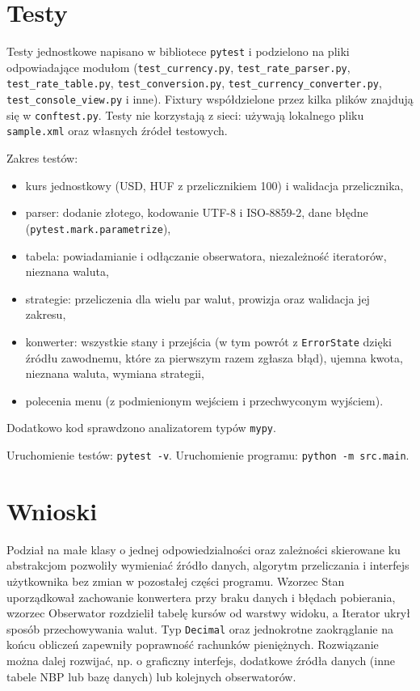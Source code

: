 \documentclass[12pt,a4paper]{article}
\begin{document}
\section{Testy}

Testy jednostkowe napisano w bibliotece \texttt{pytest} i podzielono na pliki odpowiadające modułom (\texttt{test\_currency.py}, \texttt{test\_rate\_parser.py}, \texttt{test\_rate\_table.py}, \texttt{test\_conversion.py}, \texttt{test\_currency\_converter.py}, \texttt{test\_console\_view.py} i inne). Fixtury współdzielone przez kilka plików znajdują się w \texttt{conftest.py}. Testy nie korzystają z sieci: używają lokalnego pliku \texttt{sample.xml} oraz własnych źródeł testowych.

Zakres testów:
\begin{itemize}
    \item kurs jednostkowy (USD, HUF z przelicznikiem 100) i walidacja przelicznika,
    \item parser: dodanie złotego, kodowanie UTF-8 i ISO-8859-2, dane błędne (\texttt{pytest.mark.parametrize}),
    \item tabela: powiadamianie i odłączanie obserwatora, niezależność iteratorów, nieznana waluta,
    \item strategie: przeliczenia dla wielu par walut, prowizja oraz walidacja jej zakresu,
    \item konwerter: wszystkie stany i przejścia (w tym powrót z \texttt{ErrorState} dzięki źródłu zawodnemu, które za pierwszym razem zgłasza błąd), ujemna kwota, nieznana waluta, wymiana strategii,
    \item polecenia menu (z podmienionym wejściem i przechwyconym wyjściem).
\end{itemize}
Dodatkowo kod sprawdzono analizatorem typów \texttt{mypy}.

Uruchomienie testów: \texttt{pytest -v}. Uruchomienie programu: \texttt{python -m src.main}.

\section{Wnioski}

Podział na małe klasy o jednej odpowiedzialności oraz zależności skierowane ku abstrakcjom pozwoliły wymieniać źródło danych, algorytm przeliczania i interfejs użytkownika bez zmian w pozostałej części programu. Wzorzec Stan uporządkował zachowanie konwertera przy braku danych i błędach pobierania, wzorzec Obserwator rozdzielił tabelę kursów od warstwy widoku, a Iterator ukrył sposób przechowywania walut. Typ \texttt{Decimal} oraz jednokrotne zaokrąglanie na końcu obliczeń zapewniły poprawność rachunków pieniężnych. Rozwiązanie można dalej rozwijać, np. o graficzny interfejs, dodatkowe źródła danych (inne tabele NBP lub bazę danych) lub kolejnych obserwatorów.
\end{document}
